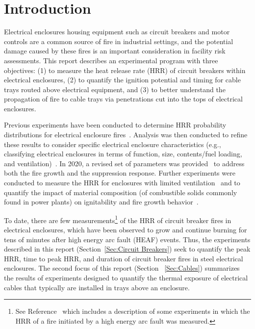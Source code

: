 \pagestyle{fancy}
\renewcommand{\headrulewidth}{0pt}
  \fancyhead{}
  \fancyhead[l]{\small \pubnumber \\
	\small \pubmonth~\pubyear \\}
\section{Introduction}

Electrical enclosures housing equipment such as circuit breakers and motor controls are a common source of fire in industrial settings, and the potential damage caused by these fires is an important consideration in facility risk assessments. This report describes an experimental program with three objectives: (1) to measure the heat release rate (HRR) of circuit breakers within electrical enclosures, (2) to quantify the ignition potential and timing for cable trays routed above electrical equipment, and (3) to better understand the propagation of fire to cable trays via penetrations cut into the tops of electrical enclosures.

Previous experiments have been conducted to determine HRR probability distributions for electrical enclosure fires~\cite{NUREG/CR-7197}. Analysis was then conducted to refine these results to consider specific electrical enclosure characteristics (e.g., classifying electrical enclosures in terms of function, size, contents/fuel loading, and ventilation)~\cite{NUREG-2178}. In 2020, a revised set of parameters was provided~\cite{NUREG2230} to address both the fire growth and the suppression response. Further experiments were conducted to measure the HRR for enclosures with limited ventilation~\cite{OLIVE-FIRE} and to quantify the impact of material composition (of combustible solids commonly found in power plants) on ignitability and fire growth behavior~\cite{leventon2024nist}.

To date, there are few measurements\footnote{See Reference~\cite{NEA_HEAF_2017} which includes a description of some experiments in which the HRR of a fire initiated by a high energy arc fault was measured.} of the HRR of circuit breaker fires in electrical enclosures, which have been observed to grow and continue burning for tens of minutes after high energy arc fault (HEAF) events. Thus, the experiments described in this report (Section~\ref{Sec:Circuit Breakers}) seek to quantify the peak HRR, time to peak HRR, and duration of circuit breaker fires in steel electrical enclosures. The second focus of this report (Section~ \ref{Sec:Cables}) summarizes the results of experiments designed to quantify the thermal exposure of electrical cables that typically are installed in trays above an enclosure.

